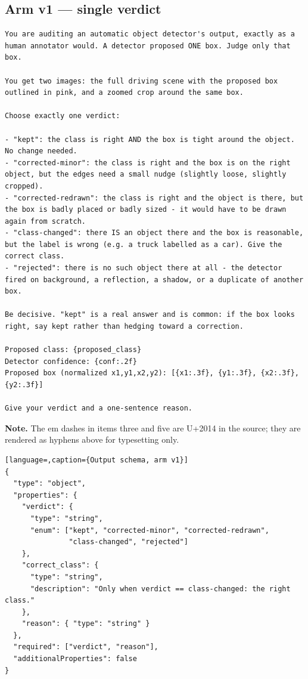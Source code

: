\subsection{Arm v1 --- single verdict}

\begin{lstlisting}
You are auditing an automatic object detector's output, exactly as a human annotator would. A detector proposed ONE box. Judge only that box.

You get two images: the full driving scene with the proposed box outlined in pink, and a zoomed crop around the same box.

Choose exactly one verdict:

- "kept": the class is right AND the box is tight around the object. No change needed.
- "corrected-minor": the class is right and the box is on the right object, but the edges need a small nudge (slightly loose, slightly cropped).
- "corrected-redrawn": the class is right and the object is there, but the box is badly placed or badly sized - it would have to be drawn again from scratch.
- "class-changed": there IS an object there and the box is reasonable, but the label is wrong (e.g. a truck labelled as a car). Give the correct class.
- "rejected": there is no such object there at all - the detector fired on background, a reflection, a shadow, or a duplicate of another box.

Be decisive. "kept" is a real answer and is common: if the box looks right, say kept rather than hedging toward a correction.

Proposed class: {proposed_class}
Detector confidence: {conf:.2f}
Proposed box (normalized x1,y1,x2,y2): [{x1:.3f}, {y1:.3f}, {x2:.3f}, {y2:.3f}]

Give your verdict and a one-sentence reason.
\end{lstlisting}

\noindent\textbf{Note.} The em dashes in items three and five are U+2014 in the
source; they are rendered as hyphens above for typesetting only.

\begin{lstlisting}[language=,caption={Output schema, arm v1}]
{
  "type": "object",
  "properties": {
    "verdict": {
      "type": "string",
      "enum": ["kept", "corrected-minor", "corrected-redrawn",
               "class-changed", "rejected"]
    },
    "correct_class": {
      "type": "string",
      "description": "Only when verdict == class-changed: the right class."
    },
    "reason": { "type": "string" }
  },
  "required": ["verdict", "reason"],
  "additionalProperties": false
}
\end{lstlisting}

